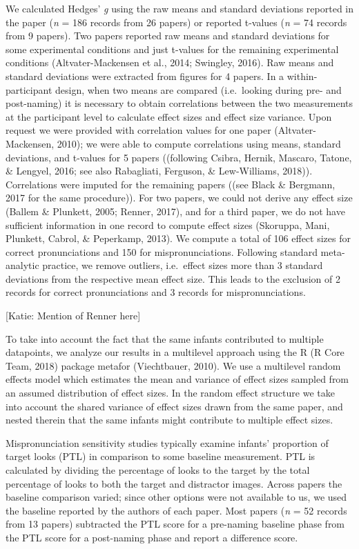 \documentclass[man]{apa6}
\theoremstyle{definition}
\theoremstyle{definition}
\theoremstyle{definition}
\theoremstyle{remark}
\begin{document}
We calculated Hedges' \emph{g} using the raw means and standard
deviations reported in the paper (\emph{n} = 186 records from 26 papers)
or reported t-values (\emph{n} = 74 records from 9 papers). Two papers
reported raw means and standard deviations for some experimental
conditions and just t-values for the remaining experimental conditions
(Altvater-Mackensen et al., 2014; Swingley, 2016). Raw means and
standard deviations were extracted from figures for 4 papers. In a
within-participant design, when two means are compared (i.e.~looking
during pre- and post-naming) it is necessary to obtain correlations
between the two measurements at the participant level to calculate
effect sizes and effect size variance. Upon request we were provided
with correlation values for one paper (Altvater-Mackensen, 2010); we
were able to compute correlations using means, standard deviations, and
t-values for 5 papers ((following Csibra, Hernik, Mascaro, Tatone, \&
Lengyel, 2016; see also Rabagliati, Ferguson, \& Lew-Williams, 2018)).
Correlations were imputed for the remaining papers ((see Black \&
Bergmann, 2017 for the same procedure)). For two papers, we could not
derive any effect size (Ballem \& Plunkett, 2005; Renner, 2017), and for
a third paper, we do not have sufficient information in one record to
compute effect sizes (Skoruppa, Mani, Plunkett, Cabrol, \& Peperkamp,
2013). We compute a total of 106 effect sizes for correct pronunciations
and 150 for mispronunciations. Following standard meta-analytic
practice, we remove outliers, i.e.~effect sizes more than 3 standard
deviations from the respective mean effect size. This leads to the
exclusion of 2 records for correct pronunciations and 3 records for
mispronunciations.

{[}Katie: Mention of Renner here{]}

To take into account the fact that the same infants contributed to
multiple datapoints, we analyze our results in a multilevel approach
using the R (R Core Team, 2018) package metafor (Viechtbauer, 2010). We
use a multilevel random effects model which estimates the mean and
variance of effect sizes sampled from an assumed distribution of effect
sizes. In the random effect structure we take into account the shared
variance of effect sizes drawn from the same paper, and nested therein
that the same infants might contribute to multiple effect sizes.

Mispronunciation sensitivity studies typically examine infants'
proportion of target looks (PTL) in comparison to some baseline
measurement. PTL is calculated by dividing the percentage of looks to
the target by the total percentage of looks to both the target and
distractor images. Across papers the baseline comparison varied; since
other options were not available to us, we used the baseline reported by
the authors of each paper. Most papers (\emph{n} = 52 records from 13
papers) subtracted the PTL score for a pre-naming baseline phase from
the PTL score for a post-naming phase and report a difference score.
\end{document}
